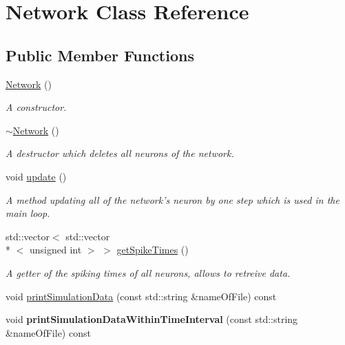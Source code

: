 \hypertarget{classNetwork}{\section{Network Class Reference}
\label{classNetwork}
}
\subsection*{Public Member Functions}
\begin{DoxyCompactItemize}
\item 
\hyperlink{classNetwork_a3cc2fb4f8fa4d507077e8da85ce5a1c8}{Network} ()
\begin{DoxyCompactList}\small\item\em A constructor. \end{DoxyCompactList}\item 
\hypertarget{classNetwork_a7a4e19cdb4bf0c7ecf82baa643831492}{\hyperlink{classNetwork_a7a4e19cdb4bf0c7ecf82baa643831492}{$\sim$\-Network} ()}\label{classNetwork_a7a4e19cdb4bf0c7ecf82baa643831492}

\begin{DoxyCompactList}\small\item\em A destructor which deletes all neurons of the network. \end{DoxyCompactList}\item 
\hypertarget{classNetwork_ab07bb6f6d9020b9eb230551083ea929f}{void \hyperlink{classNetwork_ab07bb6f6d9020b9eb230551083ea929f}{update} ()}\label{classNetwork_ab07bb6f6d9020b9eb230551083ea929f}

\begin{DoxyCompactList}\small\item\em A method updating all of the network's neuron by one step which is used in the main loop. \end{DoxyCompactList}\item 
\hypertarget{classNetwork_a618d267c0962f59027c0d063aa2b4533}{std\-::vector$<$ std\-::vector\\*
$<$ unsigned int $>$ $>$ \hyperlink{classNetwork_a618d267c0962f59027c0d063aa2b4533}{get\-Spike\-Times} ()}\label{classNetwork_a618d267c0962f59027c0d063aa2b4533}

\begin{DoxyCompactList}\small\item\em A getter of the spiking times of all neurons, allows to retreive data. \end{DoxyCompactList}\item 
void \hyperlink{classNetwork_a222e084554183af355833cda07a83877}{print\-Simulation\-Data} (const std\-::string \&name\-Of\-File) const 
\item 
\hypertarget{classNetwork_a8909c07d0e6e292f5ca54e56a797ebe0}{void {\bfseries print\-Simulation\-Data\-Within\-Time\-Interval} (const std\-::string \&name\-Of\-File) const }\label{classNetwork_a8909c07d0e6e292f5ca54e56a797ebe0}


\end{DoxyCompactItemize}
